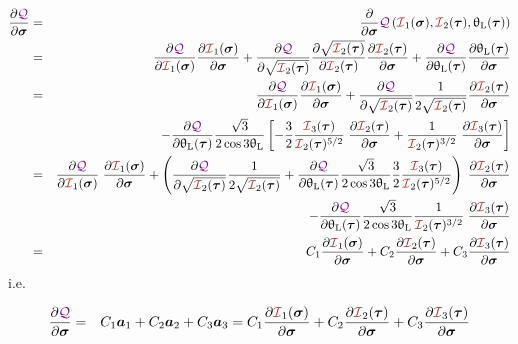 \begin{eqnarray}
\frac{\partial \QQQ}{\partial \bm\sigma}
&=&
\frac{\partial }{\partial \bm\sigma} \QQQ\left({\III}_1(\bm\sigma),{\III}_2(\bm\tau),\uptheta_{\rm L}(\bm\tau)\right)\nn\\
&=&
\frac{\partial \QQQ}{\partial {\III}_1(\bm\sigma)} 
\frac{\partial {\III}_1(\bm\sigma)}{\partial \bm\sigma} 
+
\frac{\partial \QQQ}{\partial \sqrt{{\III}_2(\bm\tau)}} 
\frac{\partial \sqrt{ {\III}_2(\bm\tau)}   }{\partial {\III}_2(\bm\tau)} 
\frac{\partial {\III}_2(\bm\tau)}{\partial \bm\sigma} 
+
\frac{\partial \QQQ}{\partial \uptheta_{\rm L}(\bm\tau)} 
\frac{\partial \uptheta_{\rm L}(\bm\tau)}{\partial \bm\sigma} \nn\\
&=&
\frac{\partial \QQQ}{\partial {\III}_1(\bm\sigma)} 
\frac{\partial {\III}_1(\bm\sigma)}{\partial \bm\sigma} 
+
\frac{\partial \QQQ}{\partial \sqrt{{\III}_2(\bm\tau)}} 
\frac{1}{2 \sqrt{ {\III}_2(\bm\tau)}   }
\frac{\partial {\III}_2(\bm\tau)}{\partial \bm\sigma} 
\nn\\
&&
-
\frac{\partial \QQQ}{\partial \uptheta_{\rm L}(\bm\tau)} 
\frac{\sqrt{3}}{2\cos 3\uptheta_{\rm L}}
\left[
-\frac32  \frac{ {\III}_3(\bm\tau)   }{ {\III}_2(\bm\tau)^{5/2}}
\; \frac{\partial {\III}_2(\bm\tau)}{\partial \bm\sigma} 
+  \frac{1}{{\III}_2(\bm\tau)^{3/2}} 
\; \frac{\partial {\III}_3(\bm\tau)}{\partial \bm\sigma} 
\right] \nn\\
&=&
\frac{\partial \QQQ}{\partial {\III}_1(\bm\sigma)} 
\; \frac{\partial {\III}_1(\bm\sigma)}{\partial \bm\sigma} 
+  
\left(\frac{\partial \QQQ}{\partial \sqrt{{\III}_2(\bm\tau)}} 
\frac{1}{2 \sqrt{ {\III}_2(\bm\tau)}   }   
+
\frac{\partial \QQQ}{\partial \uptheta_{\rm L}(\bm\tau)} 
\frac{\sqrt{3}}{2\cos 3\uptheta_{\rm L}}
\frac32  \frac{ {\III}_3(\bm\tau)   }{ {\III}_2(\bm\tau)^{5/2}}
\right)
\; \frac{\partial {\III}_2(\bm\tau)}{\partial \bm\sigma} \nn\\
&&
-
\frac{\partial \QQQ}{\partial \uptheta_{\rm L}(\bm\tau)} 
\frac{\sqrt{3}}{2\cos 3\uptheta_{\rm L}}
\frac{1}{{\III}_2(\bm\tau)^{3/2}} 
\; \frac{\partial {\III}_3(\bm\tau)}{\partial \bm\sigma} \nn\\
&=& 
C_1  \frac{\partial {\III}_1(\bm\sigma)}{\partial \bm\sigma} 
+
C_2  \frac{\partial {\III}_2(\bm\tau)}{\partial \bm\sigma} 
+
C_3  \frac{\partial {\III}_3(\bm\tau)}{\partial \bm\sigma} 
\end{eqnarray}
i.e.
\begin{mdframed}[backgroundcolor=blue!5]
\begin{eqnarray}
\frac{\partial \QQQ}{\partial \bm\sigma}
&=& 
C_1 {\bm a}_1 +
C_2 {\bm a}_2 +
C_3 {\bm a}_3 
=
C_1  \frac{\partial {\III}_1(\bm\sigma)}{\partial \bm\sigma} 
+
C_2  \frac{\partial {\III}_2(\bm\tau)}{\partial \bm\sigma} 
+
C_3  \frac{\partial {\III}_3(\bm\tau)}{\partial \bm\sigma} 
\end{eqnarray}
\end{mdframed}
